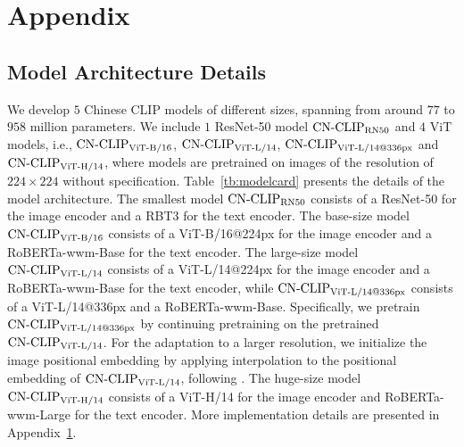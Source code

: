 \section{Appendix}
\label{sec:implementation_details}

\subsection{Model Architecture Details}
\label{subsec:model_hyperparams}


We develop $5$ Chinese CLIP models of different sizes, spanning from around $77$ to $958$ million parameters. 
We include $1$ ResNet-50 model $\text{CN-CLIP}\rm_{RN50}$ and $4$ ViT models, i.e., $\text{CN-CLIP}\rm_{ViT\text{-}B/16}$, $\text{CN-CLIP}\rm_{ViT\text{-}L/14}$, $\text{CN-CLIP}\rm_{ViT\text{-}L/14@336px}$ and $\text{CN-CLIP}\rm_{ViT\text{-}H/14}$, where models are pretrained on images of the resolution of $224 \times 224$ without specification. 
Table~\ref{tb:modelcard} presents the details of the model architecture. 
The smallest model $\text{CN-CLIP}\rm_{RN50}$ consists of a ResNet-50 for the image encoder and a RBT3 for the text encoder. 
The base-size model $\text{CN-CLIP}\rm_{ViT\text{-}B/16}$ consists of a ViT-B/16@224px for the image encoder and a RoBERTa-wwm-Base for the text encoder. 
The large-size model $\text{CN-CLIP}\rm_{ViT\text{-}L/14}$ consists of a ViT-L/14@224px for the image encoder and a RoBERTa-wwm-Base for the text encoder, while $\text{CN-CLIP}\rm_{ViT\text{-}L/14@336px}$ consists of a ViT-L/14@336px and a RoBERTa-wwm-Base. 
Specifically, we pretrain $\text{CN-CLIP}\rm_{ViT\text{-}L/14@336px}$ by continuing pretraining on the pretrained $\text{CN-CLIP}\rm_{ViT\text{-}L/14}$. 
For the adaptation to a larger resolution, we initialize the image positional embedding by applying interpolation to the positional embedding of $\text{CN-CLIP}\rm_{ViT\text{-}L/14}$, following \citet{openclip}. 
The huge-size model $\text{CN-CLIP}\rm_{ViT\text{-}H/14}$ consists of a ViT-H/14 for the image encoder and RoBERTa-wwm-Large for the text encoder. 
More implementation details are presented in Appendix~\ref{sec:implementation_details}.



